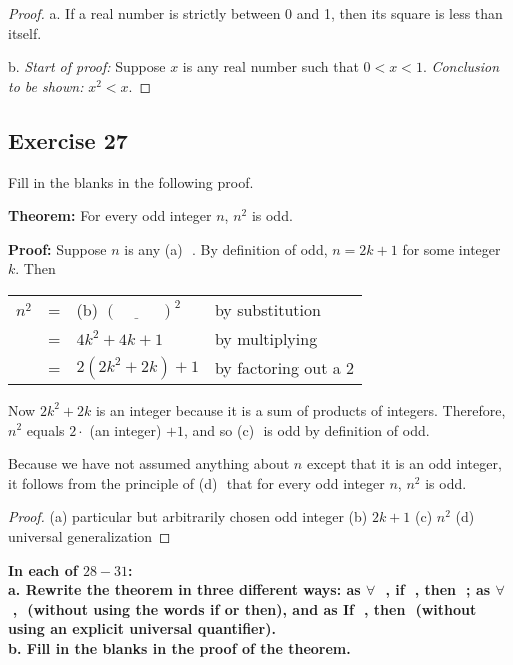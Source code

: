 \documentclass[14pt]{extarticle}
\newcommand{\fbl}{\underline{\hspace{1cm}}\,\,}
\newcommand{\fa}{\forall}
\begin{document}
\begin{proof}
a. If a real number is strictly between 0 and 1, then its square is less than itself.

b. {\it Start of proof:} Suppose $x$ is any real number such that $0 < x < 1$. {\it Conclusion to be shown:} $x^2 < x$.
\end{proof}

\subsection{Exercise 27}
Fill in the blanks in the following proof.

{\bf Theorem:} For every odd integer $n$, $n^2$ is odd.

{\bf Proof:} Suppose $n$ is any {\color{cyan}(a)} \fbl. By definition of odd, $n = 2k + 1$ for some integer $k$. Then

\begin{center}
\begin{tabular}{rcll}
$n^2$ & = & {\color{cyan}(b)} $(\fbl)^2$ & \color{cyan} by substitution \\
& = & $4k^2 + 4k + 1$ & \color{cyan} by multiplying \\
& = & $2(2k^2 + 2k) + 1$ & \color{cyan} by factoring out a 2 \\
\end{tabular}
\end{center}

Now $2k^2 + 2k$ is an integer because it is a sum of products of integers. Therefore, $n^2$ equals $2\cdot$ (an integer) $+ 1$, and so {\color{cyan}(c)} \fbl is odd by definition of odd.

Because we have not assumed anything about $n$ except that it is an odd integer, it follows from the principle of {\color{cyan}(d)} \fbl that for every odd integer $n$, $n^2$ is odd.

\begin{proof}
(a) particular but arbitrarily chosen odd integer 
(b) $2k + 1$ (c) $n^2$ (d) universal generalization
\end{proof}

{\bf \color{cyan} In each of $28-31$: \\ 
a. Rewrite the theorem in three different ways: as $\fa$ \fbl, if \fbl, then \fbl; as $\fa$ \fbl, \fbl (without using the words if or then), and as If \fbl, then \fbl (without using an explicit universal quantifier). \\
b. Fill in the blanks in the proof of the theorem.}
\end{document}
